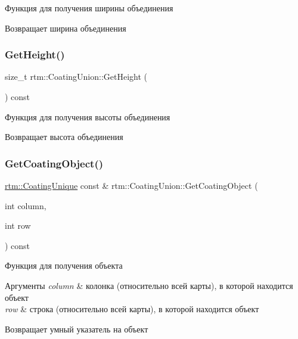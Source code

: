 Функция для получения ширины объединения 

\begin{DoxyReturn}{Возвращает}
ширина объединения 
\end{DoxyReturn}
\mbox{\label{classrtm_1_1_coating_union_ac9530320f820757aec11c51bcf8eb3cc}} 
\subsubsection{\texorpdfstring{Get\+Height()}{GetHeight()}}
{\footnotesize\ttfamily size\+\_\+t rtm\+::\+Coating\+Union\+::\+Get\+Height (\begin{DoxyParamCaption}{ }\end{DoxyParamCaption}) const}



Функция для получения высоты объединения 

\begin{DoxyReturn}{Возвращает}
высота объединения 
\end{DoxyReturn}
\mbox{\label{classrtm_1_1_coating_union_acbcdbbd157f6d55597a54bb639a977f2}} 
\subsubsection{\texorpdfstring{Get\+Coating\+Object()}{GetCoatingObject()}}
{\footnotesize\ttfamily \hyperlink{namespacertm_ab0ec616a26920aeaf720d04e041e8ce3}{rtm\+::\+Coating\+Unique} const  \& rtm\+::\+Coating\+Union\+::\+Get\+Coating\+Object (\begin{DoxyParamCaption}\item[{int}]{column,  }\item[{int}]{row }\end{DoxyParamCaption}) const}



Функция для получения объекта 


\begin{DoxyParams}{Аргументы}
{\em column} & колонка (относительно всей карты), в которой находится объект \\
\hline
{\em row} & строка (относительно всей карты), в которой находится объект \\
\hline
\end{DoxyParams}
\begin{DoxyReturn}{Возвращает}
умный указатель на объект 
\end{DoxyReturn}
\mbox{\label{classrtm_1_1_coating_union_adf3ec4f4e8399c455aaa73bfe726b4ce}} 
